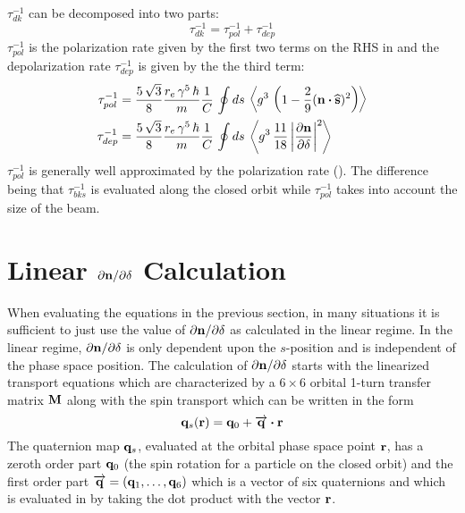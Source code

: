 $\tau_{dk}^{-1}$ can be decomposed into two parts:
\begin{equation}
  \tau_{dk}^{-1} = \tau_{pol}^{-1} + \tau_{dep}^{-1}
  \label{tdk}
\end{equation}
$\tau_{pol}^{-1}$ is the polarization rate given by the first two terms on the
RHS in  and the depolarization rate $\tau_{dep}^{-1}$ is given by the the third term:
\begin{align}
  \tau_{pol}^{-1} &= \frac{5 \, \sqrt{3}}{8} \frac{r_e \, \gamma^5 \, \hbar}{m} \frac{1}{C} \,
    \oint ds \, \left< g^3 \, \left( 1 - \frac{2}{9} ({\bf n} \mathbin{\boldsymbol{\cdot}} \widehat{{\bf s}})^2 \right) \right> 
    \nonumber \\
  \tau_{dep}^{-1} &= \frac{5 \, \sqrt{3}}{8} \frac{r_e \, \gamma^5 \, \hbar}{m}
    \frac{1}{C} \, \oint ds \, \left< g^3 \,
    \frac{11}{18} \left| \frac{\partial {\bf n}}{\partial \delta} \right|^2 \right>
    \label{tdep}
\end{align}
$\tau_{pol}^{-1}$ is generally well approximated by the  polarization
rate (). The difference being that $\tau_{bks}^{-1}$ is evaluated along the closed orbit
while $\tau_{pol}^{-1}$ takes into account the size of the beam.

\section{Linear \texorpdfstring{$\partial{\bf n}/\partial\delta$}{dn/dpz} Calculation}
\label{s:dn.calc}

When evaluating the equations in the previous section, in many situations it is sufficient to just
use the value of $\partial{\bf n}/\partial\delta$ as calculated in the linear regime. In the linear regime,
$\partial{\bf n}/\partial\delta$ is only dependent upon the $s$-position and is independent of the phase space
position. The calculation of $\partial{\bf n}/\partial\delta$ starts with the linearized transport equations which
are characterized by a $6\times6$ orbital 1-turn transfer matrix ${\bf M}$ along with the spin
transport which can be written in the form
\begin{equation}
  {\bf q}_s({\bf r}) = {\bf q}_0 + \overrightarrow{{\bf q}} \mathbin{\boldsymbol{\cdot}} {\bf r}
  \label{qqqr}
\end{equation}
The quaternion map ${\bf q}_s$, evaluated at the orbital phase space point ${\bf r}$, has a zeroth order
part ${\bf q}_0$ (the spin rotation for a particle on the closed orbit) and the first order part
$\overrightarrow{{\bf q}} = ({\bf q}_1, \ldots, {\bf q}_6)$ which is a vector of six quaternions and which is
evaluated in  by taking the dot product with the vector ${\bf r}$.

